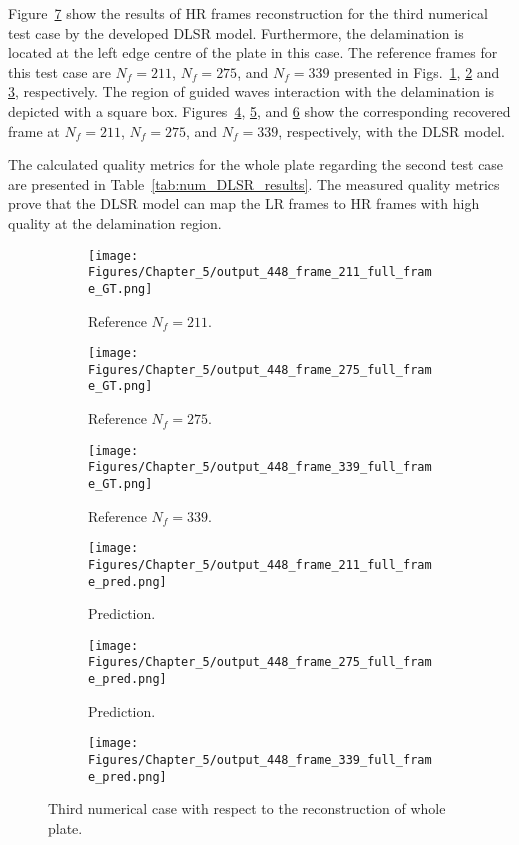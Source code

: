 Figure~\ref{fig:num_results_CS_448} show the results of HR frames reconstruction for the third numerical test case by the developed DLSR model.
Furthermore, the delamination is located at the left edge centre of the plate in this case.
The reference frames for this test case are $N_f=211$, $N_f=275$, and $N_f=339$ presented in Figs.~\ref{fig:ref_448_full_211}, \ref{fig:ref_448_full_275} and \ref{fig:ref_448_full_339}, respectively.
The region of guided waves interaction with the delamination is depicted with a square box.
Figures~\ref{fig:pred_448_full_211}, \ref{fig:pred_448_full_275}, and \ref{fig:pred_448_full_339} show the corresponding recovered frame at $N_f=211$, $N_f=275$, and $N_f=339$, respectively, with the DLSR model.

The calculated quality metrics for the whole plate regarding the second test case are presented in Table~\ref{tab:num_DLSR_results}.
The measured quality metrics prove that the DLSR model can map the LR frames to HR frames with high quality at the delamination region.
\begin{figure} [!ht]
	\centering
	\begin{subfigure}[b]{.32\textwidth}
		\centering
		\texttt{[image: Figures/Chapter\_5/output\_448\_frame\_211\_full\_frame\_GT.png]}
		\caption{Reference $N_f=211$.}
		\label{fig:ref_448_full_211}
	\end{subfigure}
	\begin{subfigure}[b]{.32\textwidth}
		\centering
		\texttt{[image: Figures/Chapter\_5/output\_448\_frame\_275\_full\_frame\_GT.png]}
		\caption{Reference $N_f=275$.}
		\label{fig:ref_448_full_275}
	\end{subfigure}
	\begin{subfigure}[b]{.32\textwidth}
		\centering
		\texttt{[image: Figures/Chapter\_5/output\_448\_frame\_339\_full\_frame\_GT.png]}
		\caption{Reference $N_f=339$.}
		\label{fig:ref_448_full_339}	
	\end{subfigure}
	\begin{subfigure}[b]{.32\textwidth}
		\centering
		\texttt{[image: Figures/Chapter\_5/output\_448\_frame\_211\_full\_frame\_pred.png]}
		\caption{Prediction.}
		\label{fig:pred_448_full_211}
	\end{subfigure}
	\begin{subfigure}[b]{.32\textwidth}
		\centering
		\texttt{[image: Figures/Chapter\_5/output\_448\_frame\_275\_full\_frame\_pred.png]}
		\caption{Prediction.}
		\label{fig:pred_448_full_275}
	\end{subfigure}
	\begin{subfigure}[b]{.32\textwidth}
		\centering
		\texttt{[image: Figures/Chapter\_5/output\_448\_frame\_339\_full\_frame\_pred.png]}
		\caption{}
		\label{fig:pred_448_full_339}	
	\end{subfigure}
	\caption{Third numerical case with respect to the reconstruction of whole plate.}
	\label{fig:num_results_CS_448}
\end{figure}

